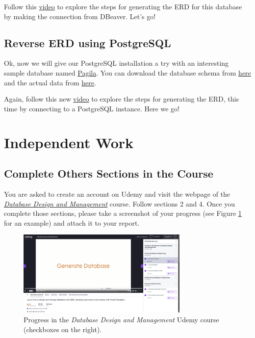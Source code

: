 \documentclass{article}
\begin{document}
Follow this \href{https://drive.google.com/file/d/1d04-Wx6gUBqxyDga-DLC4kZKiKGjq62F/view?usp=sharing}{video} to explore the steps for generating the ERD for this database by making the connection from DBeaver. Let's go!

\subsection{Reverse ERD using PostgreSQL}
Ok, now we will give our PostgreSQL installation a try with an interesting sample database named \href{https://github.com/devrimgunduz/pagila}{Pagila}. You can download the database schema from \href{https://drive.google.com/file/d/1XAHXlBIfAxmSvh8bWeMIy81YppZXu21w/view?usp=sharing}{here} and the actual data from \href{https://drive.google.com/file/d/1l3_LFHdKv9YvfaQ-aZoqeDMOjSkLTmqR/view?usp=sharing}{here}.

Again, follow this new \href{https://drive.google.com/file/d/1394GbIGQkrgSWgQN9jtLSjVkbp7NC226/view?usp=sharing}{video} to explore the steps for generating the ERD, this time by connecting to a PostgreSQL instance. Here we go!

\section{Independent Work}
\subsection{Complete Others Sections in the Course}
You are asked to create an account on Udemy and visit the webpage of the \href{https://www.udemy.com/course/database-design-and-management/}{\textit{Database Design and Management}} course. Follow sections 2 and 4. Once you complete those sections, please take a screenshot of your progress (see Figure \ref{fig:progress} for an example) and attach it to your report.

\begin{figure}[t]
    \centering
    \includegraphics[width=0.75\textwidth]{figures/progress}
    \caption{Progress in the \textit{Database Design and Management} Udemy course (checkboxes on the right).}
    \label{fig:progress}
\end{figure}
\end{document}

